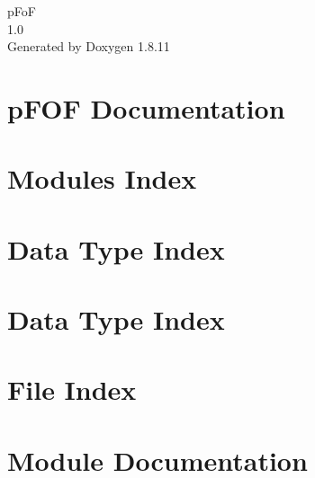 \documentclass[twoside]{book}
\newcommand{\+}{\discretionary{\mbox{\scriptsize$\hookleftarrow$}}{}{}}
\newcommand{\clearemptydoublepage}{%
  \newpage{\pagestyle{empty}\cleardoublepage}%
}
\begin{document}
\hypersetup{pageanchor=false,
             bookmarksnumbered=true,
             pdfencoding=unicode
            }
\begin{titlepage}
\vspace*{7cm}
\begin{center}%
{\Large p\+FoF \\[1ex]\large 1.\+0 }\\
\vspace*{1cm}
{\large Generated by Doxygen 1.8.11}\\
\end{center}
\end{titlepage}
\clearemptydoublepage
\tableofcontents
\clearemptydoublepage
{}
\hypersetup{pageanchor=true}

\chapter{p\+F\+OF Documentation}
\label{index}\hypertarget{index}{}
\chapter{Modules Index}

\chapter{Data Type Index}

\chapter{Data Type Index}

\chapter{File Index}

\chapter{Module Documentation}



























\end{document}
